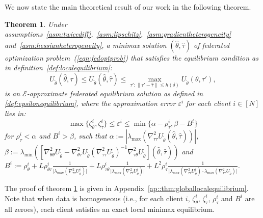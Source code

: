\documentclass{article}
\newtheorem{theorem}{Theorem}%
\theoremstyle{definition}
\begin{document}
We now state the main theoretical result of our work in the following theorem.    
    \begin{theorem}
    \label{sec::thm:globallocalequilibrium}
        Under assumptions~\ref{asm:twicediff},~\ref{asm:lipschitz},~\ref{asm:gradientheterogeneity} and~\ref{asm:hessianheterogeneity}, a minimax solution $(\hat\theta,\hat\tau)$ of federated optimization problem~(\ref{eqn:fedoptprob}) that satisfies the equilibrium condition as in definition~\ref{def:localequilibrium}: 
          \begin{equation*}
	     U_{\tilde\theta}(\hat\theta,\tau)\leq U_{\tilde\theta}(\hat\theta,\hat\tau)\leq \max_{{\tau\prime : \|\tau\prime-\hat\tau\|\leq h(\delta)}}U_{\tilde\theta}(\theta,\tau\prime),
		\end{equation*}
     is an $\mathcal{E}$-approximate federated equilibrium solution as defined in \ref{def:epsilonequilibrium}, where the approximation error $\varepsilon^i$ for each client $i\in[N]$ lies in:
\begin{equation*}
\max\{ \zeta_{\theta}^i, \zeta_{\tau}^i\}\le \varepsilon^i\le \min\{\alpha-\rho_{\tau}^i,\beta- B^i \}    
\end{equation*} 
 for $\rho_{\tau}^i<\alpha$ and $B^i>\beta$, such that $\alpha:=\left\vert\lambda_{\max}\left(\nabla_{\tau\tau}^2U_{\tilde\theta}(\hat\theta,\hat\tau)\right)\right\vert$, $\beta:=\lambda_{\min}\left(\left[\nabla_{\theta\theta}^2U_{\tilde\theta}-\nabla_{\theta\tau}^2U_{\tilde\theta}\left(\nabla_{\tau\tau}^2U_{\tilde\theta}\right)^{-1}\nabla_{\tau\theta}^2U_{\tilde\theta}\right](\hat\theta,\hat\tau)\right)$ and $B^i:=\rho_{\theta}^i+ L\rho_{\theta\tau}^i\frac{1}{\vert\lambda_{\max}(\nabla_{\tau\tau}^2 U_{\tilde\theta}^i)\vert}+L\rho_{\tau\theta}^i\frac{1}{\vert\lambda_{\max}(\nabla_{\tau\tau}^2 U_{\tilde\theta}^i)\vert}+ L^2\rho_{\tau}^i\frac{1}{\vert\lambda_{\max}(\nabla_{\tau\tau}^2 U_{\tilde\theta}^i)\cdot\lambda_{\max}(\nabla_{\tau\tau}^2 U_{\tilde\theta})\vert}$.
    \end{theorem}
    The proof of theorem \ref{sec::thm:globallocalequilibrium} is given in Appendix~\ref{ap::thm:globallocalequilibrium}. Note that when data is homogeneous (i.e., for each client $i$, $\zeta_{\theta}^i$, $\zeta_{\tau}^i$, $\rho_{\tau}^i$ and $B^i$ are all zeroes), each client satisfies an exact local minimax equilibrium.
\end{document}

